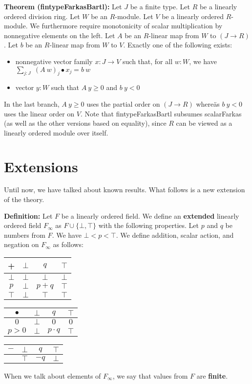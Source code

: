 \documentclass[]{article}
\renewcommand{\.}{\hskip .75pt}
\let\r=\rightarrow
\begin{document}
\medskip \noindent
\textbf{Theorem (fintypeFarkasBartl):}
Let $J$ be a finite type.
Let $R$ be a linearly ordered division ring.
Let $W$ be an $R$-module.
Let $V$ be a linearly ordered $R$-module. We furthermore require 
monotonicity of scalar multiplication by nonnegative elements on the left.
Let $A$ be an $R$-linear map from $W$ to $(J \r R)$.
Let $b$ be an $R$-linear map from $W$ to $V$.
Exactly one of the following exists:
\begin{itemize}
\item nonnegative vector family $x : J \r V$ such that, for all $w : W$, we have
$ \sum_{j : J}\; (A~w)_j \bullet x_j = b~w $
\item vector $y : W$ such that $A~y \ge 0$ and $b~y < 0$
\end{itemize}
In the last branch, $A~y \ge 0$ uses the partial order on $(J \r R)$ whereäs
$b~y < 0$ uses the linear order on $V$.
Note that fintypeFarkasBartl subsumes scalarFarkas (as well as the other versions based on equality),
since $R$ can be viewed as a linearly ordered module over itself.

\newpage

\section{Extensions}

Until now, we have talked about known results.
What follows is a new extension of the theory.

\medskip \noindent
\textbf{Definition:}
Let $F$ be a linearly ordered field.
We define an \textbf{extended} linearly ordered field $F_\infty$ as
$F \cup \{ \bot, \top \}$ with the following properties.
Let $p$ and $q$ be numbers from $F$.
We have $\bot < p < \top$.
We define addition, scalar action, and negation on $F_\infty$ as follows:
\begin{center}
	\begin{tabular}{ c || c | c | c | }
		+ & $\bot$ & $q$ & $\top$  \\
		\hline\hline
		$\bot$ & $\bot$ & $\bot$ & $\bot$  \\ 
		\hline
		$p$ & $\bot$ & $p\!+\!q$ & $\top$  \\ 
		\hline
		$\top$ & $\bot$ & $\top$ & $\top$ \\ 
		\hline
	\end{tabular}
	\qquad\qquad\qquad
	\begin{tabular}{ c || c | c | c | }
		$\bullet$ & $\bot$ & $q$ & $\top$  \\
		\hline\hline
		$0$ & $\bot$ & $0$ & $0$  \\ 
		\hline
		$p>0$ & $\bot$ & $p \cdot q$ & $\top$  \\ 
		\hline
	\end{tabular}
	\qquad\qquad\qquad
	\begin{tabular}{ c || c | c | c }
	$-$ & $\bot$ & $q$ & $\top$  \\
	\hline\hline
	& $\top$ & $-q$ & $\bot$  
	\end{tabular}
\end{center}
When we talk about elements of $F_\infty$,
we say that values from $F$ are \textbf{finite}.
\end{document}

